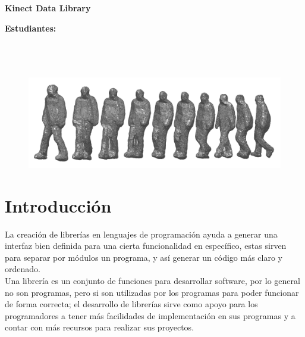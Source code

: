 \documentclass[letterpaper]{article}
\begin{document}
\vspace*{2cm}

\begin{center}
\Huge
\textbf{Kinect Data Library}
\vspace*{1cm}
\end{center}

\noindent
\small\baselineskip=14pt
\textbf{Estudiantes:} \\
\\
\\
\\


\begin{figure}[ht]
\includegraphics[width=1\linewidth]{visual_hull_4.png}
\end{figure}


\section{Introducción}
La creación de librerías en lenguajes de programación ayuda a generar una interfaz bien definida para una cierta funcionalidad en específico, 
estas sirven para separar por módulos un programa, y así generar un código más claro y ordenado.\\

Una librería es un conjunto de funciones para desarrollar software, por lo general no son programas, pero si son utilizadas por los programas 
para poder funcionar de forma correcta; el desarrollo de librerías sirve como apoyo para los programadores a tener más facilidades de implementación 
en sus programas y a contar con más recursos para realizar sus proyectos.\\
\end{document}
